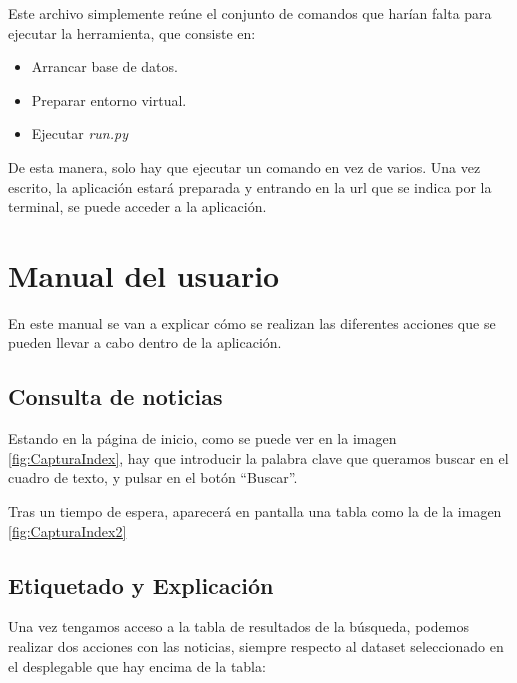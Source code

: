 Este archivo simplemente reúne el conjunto de comandos que harían falta para ejecutar la herramienta, que consiste en:

\begin{itemize}

\item Arrancar base de datos.

\item Preparar entorno virtual.

\item Ejecutar \emph{run.py}

\end{itemize} 

De esta manera, solo hay que ejecutar un comando en vez de varios. Una vez escrito, la aplicación estará preparada y entrando en la url que se indica por la terminal, se puede acceder a la aplicación.

\section{Manual del usuario}

En este manual se van a explicar cómo se realizan las diferentes acciones que se pueden llevar a cabo dentro de la aplicación.

\subsection{Consulta de noticias}

Estando en la página de inicio, como se puede ver en la imagen \ref{fig:CapturaIndex}, hay que introducir la palabra clave que queramos buscar en el cuadro de texto, y pulsar en el botón ``Buscar''.


Tras un tiempo de espera, aparecerá en pantalla una tabla como la de la imagen \ref{fig:CapturaIndex2}


\subsection{Etiquetado y Explicación}

Una vez tengamos acceso a la tabla de resultados de la búsqueda, podemos realizar dos acciones con las noticias, siempre respecto al dataset seleccionado en el desplegable que hay encima de la tabla:

